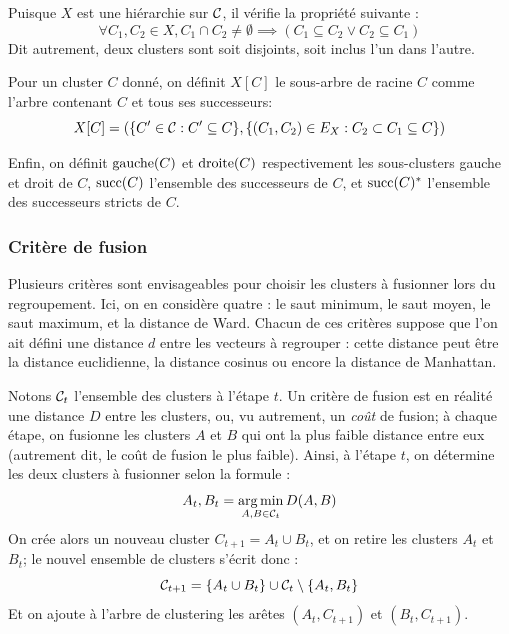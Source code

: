 Puisque $X$ est une hiérarchie sur $\Clusters$, il vérifie la propriété suivante :
\begin{equation}
    \forall C_1, C_2 \in X, C_1 \cap C_2 \neq \emptyset \implies (C_1 \subseteq C_2 \lor C_2 \subseteq C_1)
\end{equation}
Dit autrement, deux clusters sont soit disjoints, soit inclus l'un dans l'autre.

Pour un cluster $C$ donné, on définit $X[C]$ le sous-arbre de racine $C$ comme l'arbre contenant $C$ et tous ses successeurs:
\begin{equation}
    X[C] = (\{C' \in \Clusters : C' \subseteq C\}, \{(C_1, C_2) \in E_X : C_2 \subset C_1 \subseteq C\})
\end{equation}

Enfin, on définit $\gauche(C)$ et $\droite(C)$ respectivement les sous-clusters gauche et droit de $C$, $\succs(C)$ l'ensemble des successeurs de $C$, et $\succs(C)^*$ l'ensemble des successeurs stricts de $C$.

\subsubsection{Critère de fusion}
\label{sec:te-clustering-linkage}

Plusieurs critères sont envisageables pour choisir les clusters à fusionner lors du regroupement. Ici, on en considère quatre : le saut minimum, le saut moyen, le saut maximum, et la distance de Ward. Chacun de ces critères suppose que l'on ait défini une distance $d$ entre les vecteurs à regrouper : cette distance peut être la distance euclidienne, la distance cosinus ou encore la distance de Manhattan. 

Notons $\cal{C}_t$ l'ensemble des clusters à l'étape $t$. Un critère de fusion est en réalité une distance $D$ entre les clusters, ou, vu autrement, un \textit{coût} de fusion; à chaque étape, on fusionne les clusters $A$ et $B$ qui ont la plus faible distance entre eux (autrement dit, le coût de fusion le plus faible). Ainsi, à l'étape $t$, on détermine les deux clusters à fusionner selon la formule :
\begin{equation}
    A_t, B_t = \argmin_{A, B \in \cal{C}_t} D(A, B)
\end{equation}
On crée alors un nouveau cluster $C_{t+1} = A_t \cup B_t$, et on retire les clusters $A_t$ et $B_t$; le nouvel ensemble de clusters s'écrit donc :
\begin{equation}
    \cal{C}_{t+1} = \{ A_t \cup B_t \} \cup \cal{C}_t \setminus \{ A_t, B_t \}
\end{equation}
Et on ajoute à l'arbre de clustering les arêtes $(A_t, C_{t+1})$ et $(B_t, C_{t+1})$.



